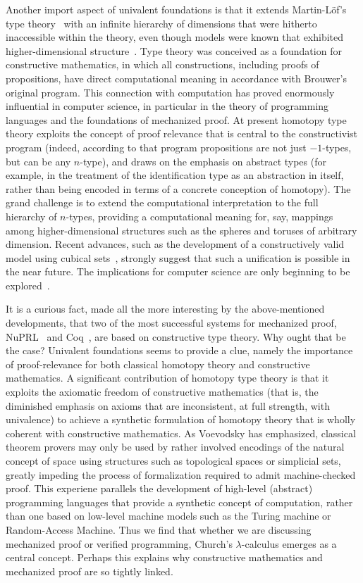 \documentclass[11pt]{article}
\theoremstyle{remark}
\theoremstyle{definition}
\begin{document}
Another import aspect of univalent foundations is that it extends Martin-L\"{o}f's type theory~\cite{mltt} with an
infinite hierarchy of dimensions that were hitherto inaccessible within the theory, even though models were known that
exhibited higher-dimensional structure~\cite{hofmann-streicher}.  Type theory was conceived as a foundation for
constructive mathematics, in which all constructions, including proofs of propositions, have direct computational
meaning in accordance with Brouwer's original program.  This connection with computation has proved enormously
influential in computer science, in particular in the theory of programming languages and the foundations of mechanized
proof.  At present homotopy type theory exploits the concept of proof relevance that is central to the constructivist
program (indeed, according to that program propositions are not just $-1$-types, but can be any $n$-type), and draws on
the emphasis on abstract types (for example, in the treatment of the identification type as an abstraction in itself,
rather than being encoded in terms of a concrete conception of homotopy).  The grand challenge is to extend the
computational interpretation to the full hierarchy of $n$-types, providing a computational meaning for, say, mappings
among higher-dimensional structures such as the spheres and toruses of arbitrary dimension.  Recent advances, such as
the development of a constructively valid model using cubical sets~\cite{bch}, strongly suggest that such a unification
is possible in the near future.  The implications for computer science are only beginning to be
explored~\cite{patch-theory}.

It is a curious fact, made all the more interesting by the above-mentioned developments, that two of the most successful
systems for mechanized proof, NuPRL~\cite{nuprl-book} and Coq~\cite{coq}, are based on constructive type theory.  Why
ought that be the case?  Univalent foundations seems to provide a clue, namely the importance of proof-relevance for
both classical homotopy theory and constructive mathematics.  A significant contribution of homotopy type theory is that
it exploits the axiomatic freedom of constructive mathematics (that is, the diminished emphasis on axioms that are
inconsistent, at full strength, with univalence) to achieve a synthetic formulation of homotopy theory that is wholly
coherent with constructive mathematics.  As Voevodsky has emphasized, classical theorem provers may only be used by
rather involved encodings of the natural concept of space using structures such as topological spaces or simplicial
sets, greatly impeding the process of formalization required to admit machine-checked proof.  This experiene parallels
the development of high-level (abstract) programming languages that provide a synthetic concept of computation, rather
than one based on low-level machine models such as the Turing machine or Random-Access Machine.  Thus we find that
whether we are discussing mechanized proof or verified programming, Church's $\lambda$-calculus emerges as a central
concept.  Perhaps this explains why constructive mathematics and mechanized proof are so tightly linked.
\end{document}
